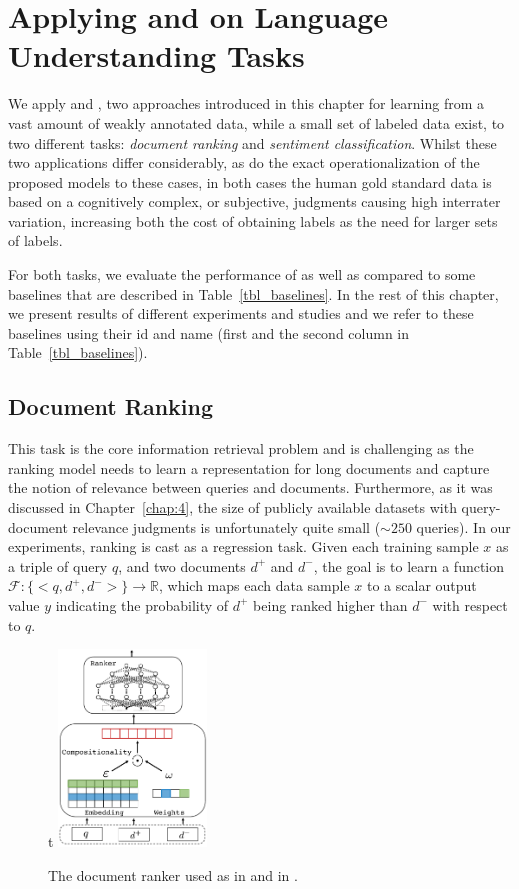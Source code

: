 \section{Applying \cws and \fwl on Language Understanding Tasks}
We apply \cws and \fwl, two approaches introduced in this chapter for learning from a vast amount of weakly annotated data, while a small set of labeled data exist, to two different tasks: \emph{document ranking} and \emph{sentiment classification}. 
Whilst these two applications differ considerably, as do the exact operationalization of the proposed models to these cases, in both cases the human gold standard data is based on a cognitively complex, or subjective, judgments causing high interrater variation, increasing both the cost of obtaining labels as the need for larger sets of labels.


For both tasks, we evaluate the performance of \cws as well as \fwl compared to some baselines that are described in Table~\ref{tbl_baselines}. In the rest of this chapter, we present results of different experiments and studies and we refer to these baselines using their id and name (first and the second column in Table~\ref{tbl_baselines}).

\subsection{Document Ranking}
This task is the core information retrieval problem and is challenging as the ranking model needs to learn a representation for long documents and capture the notion of relevance between queries and documents. Furthermore, as it was discussed in Chapter~\ref{chap:4}, the size of publicly available datasets with query-document relevance judgments is unfortunately quite small ($\sim 250$ queries).
%
In our experiments, ranking is cast as a regression task. Given each training sample $x$ as a triple of query $q$, and two documents $d^+$ and $d^-$, the goal is to learn a function $\mathcal{F} : \{<q, d^+, d^->\} \rightarrow \mathbb{R}$, which maps each data sample $x$ to a scalar output value $y$ indicating the probability of $d^+$ being ranked higher than $d^-$ with respect to $q$. 

\begin{figure}{t}
    \centering
            \includegraphics[width=0.35\textwidth]{03-part-02/chapter-05/figs_and_tables/fig_ranker.pdf}
    \caption{The document ranker used as \tch in \cws and \std in \fwl.}
    \label{fig:ranker}
\end{figure}



